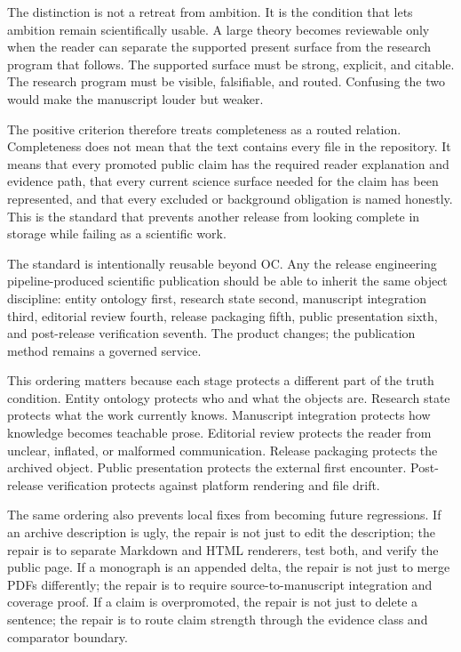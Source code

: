 The distinction is not a retreat from ambition. It is the condition that lets ambition remain scientifically usable. A large theory becomes reviewable only when the reader can separate the supported present surface from the research program that follows. The supported surface must be strong, explicit, and citable. The research program must be visible, falsifiable, and routed. Confusing the two would make the manuscript louder but weaker.


The positive criterion therefore treats completeness as a routed relation. Completeness does not mean that the text contains every file in the repository. It means that every promoted public claim has the required reader explanation and evidence path, that every current science surface needed for the claim has been represented, and that every excluded or background obligation is named honestly. This is the standard that prevents another release from looking complete in storage while failing as a scientific work.


The standard is intentionally reusable beyond OC. Any the release engineering pipeline-produced scientific publication should be able to inherit the same object discipline: entity ontology first, research state second, manuscript integration third, editorial review fourth, release packaging fifth, public presentation sixth, and post-release verification seventh. The product changes; the publication method remains a governed service.


This ordering matters because each stage protects a different part of the truth condition. Entity ontology protects who and what the objects are. Research state protects what the work currently knows. Manuscript integration protects how knowledge becomes teachable prose. Editorial review protects the reader from unclear, inflated, or malformed communication. Release packaging protects the archived object. Public presentation protects the external first encounter. Post-release verification protects against platform rendering and file drift.


The same ordering also prevents local fixes from becoming future regressions. If an archive description is ugly, the repair is not just to edit the description; the repair is to separate Markdown and HTML renderers, test both, and verify the public page. If a monograph is an appended delta, the repair is not just to merge PDFs differently; the repair is to require source-to-manuscript integration and coverage proof. If a claim is overpromoted, the repair is not just to delete a sentence; the repair is to route claim strength through the evidence class and comparator boundary.


